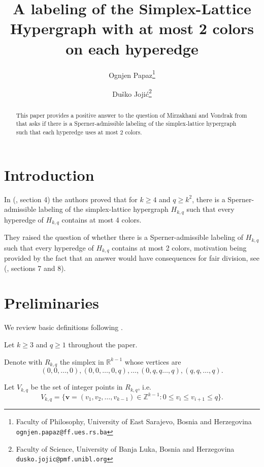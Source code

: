 \documentclass[12pt]{article}
\begin{document}
\title{\Large A labeling of the Simplex-Lattice Hypergraph with at most 2 colors on each hyperedge}
\author{Ognjen Papaz\thanks{Faculty of Philosophy, University of East Sarajevo, Bosnia and Herzegovina {\tt ognjen.papaz@ff.ues.rs.ba}}
 \and Du\v sko Joji\'c\thanks{Faculty of Science, University of Banja Luka, Bosnia and Herzegovina {\tt dusko.jojic@pmf.unibl.org}}}
\date{}
\maketitle

\begin{abstract}
This paper provides a positive answer to the question of Mirzakhani and Vondrak from \cite{MV} that asks if there is a Sperner-admissible labeling of the simplex-lattice hypergraph such that each hyperedge uses at most 2 colors.
\end{abstract}

\section{Introduction}

In (\cite{MV}, section 4) the authors proved that for $k\geq 4$ and $q\geq k^2$, there is a Sperner-admissible labeling of the simplex-lattice hypergraph $H_{k,q}$ such that every hyperedge of $H_{k,q}$ contains at most 4 colors.

They raised the question of whether there is a Sperner-admissible labeling  of $H_{k,q}$ such that every hyperedge of $H_{k,q}$ contains at most 2 colors, motivation being provided by the fact that an answer would have consequences for fair division, see (\cite{MV}, sections 7 and 8).  



\section{Preliminaries}

We review basic definitions following \cite{MV}. 

Let $k\geq 3$ and $q\geq 1$ throughout the paper.

Denote with $R_{k,q}$ the simplex in $\mathbb R^{k-1}$ whose vertices are
\[(0,0,\ldots,0),(0,0,\ldots,0,q),\ldots,(0,q,q\ldots,q),(q,q,\ldots,q).\]

Let $V_{k,q}$ be the set of integer points in $R_{k,q}$, i.e.
\[V_{k,q}=\{\bm{v}=(v_1,v_2,\ldots,v_{k-1})\in \mathbb Z^{k-1}:0\leq v_i\leq v_{i+1}\leq q\}.\]
\end{document}
